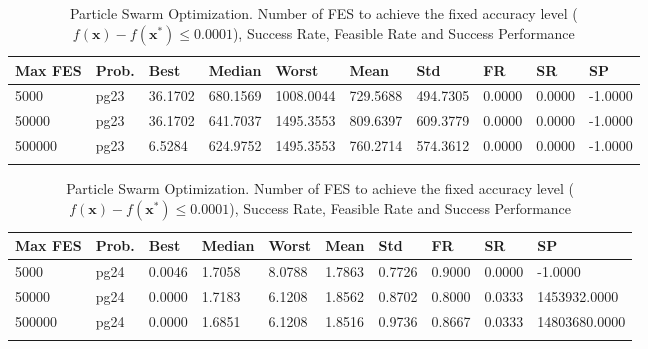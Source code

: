 \documentclass[10pt, a4paper]{book}
\begin{document}
\begin{center}
\begin{longtable}{l l l l l l l l l l}
\textbf{Max FES} & \textbf{Prob.} & \textbf{Best} & \textbf{Median} & \textbf{Worst} & \textbf{Mean} & \textbf{Std} & \textbf{FR} & \textbf{SR} & \textbf{SP} \\
\hline
5000 & pg23 & 36.1702 & 680.1569 & 1008.0044 & 729.5688 & 494.7305 & 0.0000 & 0.0000 & -1.0000 \\
50000 & pg23 & 36.1702 & 641.7037 & 1495.3553 & 809.6397 & 609.3779 & 0.0000 & 0.0000 & -1.0000 \\
500000 & pg23 & 6.5284 & 624.9752 & 1495.3553 & 760.2714 & 574.3612 & 0.0000 & 0.0000 & -1.0000 \\

\caption{ Particle Swarm Optimization. Number of FES to achieve the fixed accuracy level ($f(\mathbf{x}) - f(\mathbf{x}^{*}) \leq 0.0001$), Success Rate, Feasible Rate and Success Performance }
\end{longtable}
\end{center}

\begin{center}
\begin{longtable}{l l l l l l l l l l}
\textbf{Max FES} & \textbf{Prob.} & \textbf{Best} & \textbf{Median} & \textbf{Worst} & \textbf{Mean} & \textbf{Std} & \textbf{FR} & \textbf{SR} & \textbf{SP} \\
\hline
5000 & pg24 & 0.0046 & 1.7058 & 8.0788 & 1.7863 & 0.7726 & 0.9000 & 0.0000 & -1.0000 \\
50000 & pg24 & 0.0000 & 1.7183 & 6.1208 & 1.8562 & 0.8702 & 0.8000 & 0.0333 & 1453932.0000 \\
500000 & pg24 & 0.0000 & 1.6851 & 6.1208 & 1.8516 & 0.9736 & 0.8667 & 0.0333 & 14803680.0000 \\

\caption{ Particle Swarm Optimization. Number of FES to achieve the fixed accuracy level ($f(\mathbf{x}) - f(\mathbf{x}^{*}) \leq 0.0001$), Success Rate, Feasible Rate and Success Performance }
\end{longtable}
\end{center}
\end{document}
